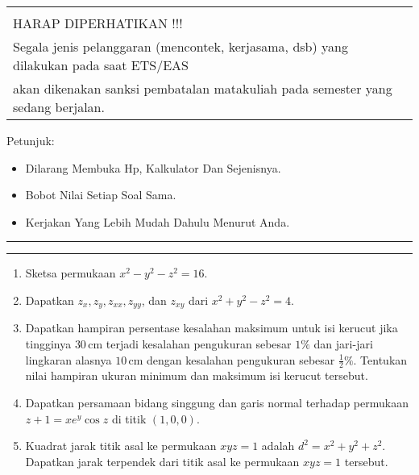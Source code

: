 \documentclass[11pt,a4paper]{article}
\begin{document}
\begin{table}[h!]
\begin{tabular}{r c}
    \\
     &                                                                                                                                                                               \\
    \multicolumn{2}{l}{\color{red}\MakeUppercase{harap diperhatikan !!!}}                                                                                                            \\
    \multicolumn{2}{l}{\color{red}Segala jenis pelanggaran (mencontek, kerjasama, dsb) yang dilakukan pada saat ETS/EAS}                                                             \\
    \multicolumn{2}{l}{\color{red}akan dikenakan sanksi pembatalan matakuliah pada semester yang sedang berjalan.}                                                                   \\
  \end{tabular}
\end{table}
Petunjuk:
\begin{itemize}
  \item Dilarang Membuka Hp, Kalkulator Dan Sejenisnya.
  \item Bobot Nilai Setiap Soal Sama.
  \item Kerjakan Yang Lebih Mudah Dahulu Menurut Anda.
\end{itemize}
\hrule
\hrule
\begin{enumerate}
  \item Sketsa permukaan
        $
          x^2 - y^2 - z^2 = 16.
        $

  \item Dapatkan $z_x, z_y, z_{xx}, z_{yy}$, dan $z_{xy}$ dari
        $
          x^2 + y^2 - z^2 = 4.
        $

  \item Dapatkan hampiran persentase kesalahan maksimum untuk isi kerucut jika tingginya $30\,\text{cm}$ terjadi kesalahan pengukuran sebesar $1\%$ dan jari-jari lingkaran alasnya $10\,\text{cm}$ dengan kesalahan pengukuran sebesar $\tfrac{1}{2}\%$. Tentukan nilai hampiran ukuran minimum dan maksimum isi kerucut tersebut.

  \item Dapatkan persamaan bidang singgung dan garis normal terhadap permukaan
        $
          z + 1 = x e^{y} \cos z
        $
        di titik $(1, 0, 0)$.

  \item Kuadrat jarak titik asal ke permukaan $xyz = 1$ adalah
        $
          d^2 = x^2 + y^2 + z^2.
        $
        Dapatkan jarak terpendek dari titik asal ke permukaan $xyz = 1$ tersebut.
\end{enumerate}
\end{document}
